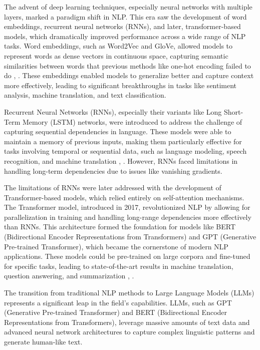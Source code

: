 \begin{enumerate}
    The advent of deep learning techniques, especially neural networks with multiple layers, marked a paradigm shift in NLP. This era saw the development of word embeddings, recurrent neural networks (RNNs), and later, transformer-based models, which dramatically improved performance across a wide range of NLP tasks. Word embeddings, such as Word2Vec and GloVe, allowed models to represent words as dense vectors in continuous space, capturing semantic similarities between words that previous methods like one-hot encoding failed to do \cite{lauriola2022introduction}, \cite{henderson2020unstoppable}. These embeddings enabled models to generalize better and capture context more effectively, leading to significant breakthroughs in tasks like sentiment analysis, machine translation, and text classification.

Recurrent Neural Networks (RNNs), especially their variants like Long Short-Term Memory (LSTM) networks, were introduced to address the challenge of capturing sequential dependencies in language. These models were able to maintain a memory of previous inputs, making them particularly effective for tasks involving temporal or sequential data, such as language modeling, speech recognition, and machine translation \cite{peng2022survey}, \cite{lauriola2022introduction}. However, RNNs faced limitations in handling long-term dependencies due to issues like vanishing gradients.

The limitations of RNNs were later addressed with the development of Transformer-based models, which relied entirely on self-attention mechanisms. The Transformer model, introduced in 2017, revolutionized NLP by allowing for parallelization in training and handling long-range dependencies more effectively than RNNs. This architecture formed the foundation for models like BERT (Bidirectional Encoder Representations from Transformers) and GPT (Generative Pre-trained Transformer), which became the cornerstone of modern NLP applications. These models could be pre-trained on large corpora and fine-tuned for specific tasks, leading to state-of-the-art results in machine translation, question answering, and summarization \cite{lauriola2022introduction}, \cite{henderson2020unstoppable}.
\end{enumerate}

The transition from traditional NLP methods to Large Language Models (LLMs) represents a significant leap in the field's capabilities. LLMs, such as GPT (Generative Pre-trained Transformer) and BERT (Bidirectional Encoder Representations from Transformers), leverage massive amounts of text data and advanced neural network architectures to capture complex linguistic patterns and generate human-like text.

